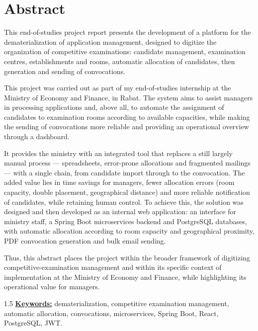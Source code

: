 \chapter*{Abstract}
\adjustmtc
\thispagestyle{MyStyle}

This end-of-studies project report presents the development of a platform for the dematerialization of application management, designed to digitize the organization of competitive examinations: candidate management, examination centres, establishments and rooms, automatic allocation of candidates, then generation and sending of convocations.

This project was carried out as part of my end-of-studies internship at the Ministry of Economy and Finance, in Rabat. The system aims to assist managers in processing applications and, above all, to automate the assignment of candidates to examination rooms according to available capacities, while making the sending of convocations more reliable and providing an operational overview through a dashboard.

It provides the ministry with an integrated tool that replaces a still largely manual process --- spreadsheets, error-prone allocations and fragmented mailings --- with a single chain, from candidate import through to the convocation. The added value lies in time savings for managers, fewer allocation errors (room capacity, double placement, geographical distance) and more reliable notification of candidates, while retaining human control. To achieve this, the solution was designed and then developed as an internal web application: an interface for ministry staff, a Spring Boot microservices backend and PostgreSQL databases, with automatic allocation according to room capacity and geographical proximity, PDF convocation generation and bulk email sending.

Thus, this abstract places the project within the broader framework of digitizing competitive-examination management and within its specific context of implementation at the Ministry of Economy and Finance, while highlighting its operational value for managers.

\begin{spacing}{1.5}
\underline{\textbf{Keywords:}} dematerialization, competitive examination management, automatic allocation, convocations, microservices, Spring Boot, React, PostgreSQL, JWT.
\end{spacing}
